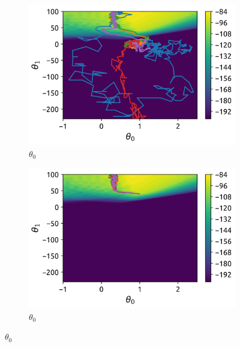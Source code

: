 \documentclass{article}
\begin{document}
\begin{figure}
\begin{subfigure}[b]{0.3\textwidth}
    \centering
    \includegraphics[width=\textwidth]{img-1.png}
    \caption{$\theta _0$}
    \label{fig1}
\end{subfigure}
\begin{subfigure}[b]{0.3\textwidth}
    \centering
    \includegraphics[width=\textwidth]{img-3.png}
    \caption{$\theta _0$}
    \label{fig2}
\end{subfigure}
\end{figure}
\end{document}
